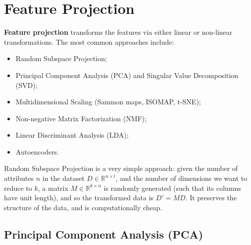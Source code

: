 \section{Feature Projection}

\textbf{Feature projection} transforms the features via either linear or non-linear transformations. The most common approaches include:
\begin{itemize}
    \item Random Subspace Projection;

    \item Principal Component Analysis (PCA) and Singular Value Decomposition (SVD);
    
    \item Multidimensional Scaling (Sammon maps, ISOMAP, t-SNE);

    \item Non-negative Matrix Factorization (NMF);

    \item Linear Discriminant Analysis (LDA);

    \item Autoencoders.
\end{itemize}
Random Subspace Projection is a very simple approach: given the number of attributes $n$ in the dataset $D \in \mathbb{R}^{n \times l}$, and the number of dimensions we want to reduce to $k$, a matrix $M \in \mathbb{R}^{k \times n}$ is randomly generated (such that its columns have unit length), and so the transformed data is $D' = MD$. It preserves the structure of the data, and is computationally cheap.

\subsection{Principal Component Analysis (PCA)}

